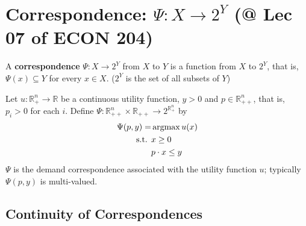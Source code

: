 \documentclass[11pt]{elegantbook}
\newcommand{\argmax}{\operatornamewithlimits{argmax}}
\begin{document}
\chapter{Correspondence: $\Psi : X \rightarrow 2^Y$ \small{(@ Lec 07 of ECON 204)}}
\begin{definition}[Correspondence]
    \normalfont
    A \textbf{correspondence} $\Psi : X \rightarrow 2^Y$ from $X$ to $Y$ is a function from $X$ to $2^Y$, that is, $\Psi(x) \subseteq Y$ for every $x \in X$. ($2^Y$ is the set of all subsets of $Y$)
\end{definition}
\begin{example}
Let $u : \mathbb{R}_+^n \rightarrow \mathbb{R}$ be a continuous utility function, $y > 0$ and $p \in \mathbb{R}_{++}^n$, that is, $p_i > 0$ for each $i$. Define $\Psi : \mathbb{R}_{++}^n \times \mathbb{R}_{++} \rightarrow 2^{\mathbb{R}_{+}^n}$ by
\begin{equation}
    \begin{aligned}
        \Psi(p,y)=&\argmax u(x)\\
        \textnormal{s.t. }&x\geq 0\\
        &p\cdot x\leq y
    \end{aligned}
    \nonumber
\end{equation}
$\Psi$ is the demand correspondence associated with the utility function $u$; typically $\Psi(p, y)$ is multi-valued.
\end{example}

\section{Continuity of Correspondences}
\end{document}

